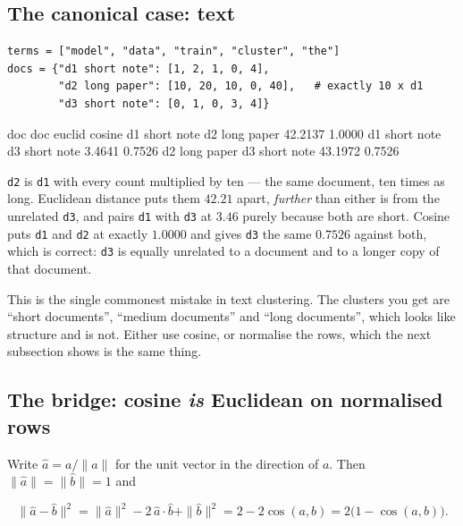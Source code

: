 \documentclass[11pt]{article}
\begin{document}
\subsection{The canonical case: text}

\begin{lstlisting}
terms = ["model", "data", "train", "cluster", "the"]
docs = {"d1 short note": [1, 2, 1, 0, 4],
        "d2 long paper": [10, 20, 10, 0, 40],   # exactly 10 x d1
        "d3 short note": [0, 1, 0, 3, 4]}
\end{lstlisting}
\begin{codeout}
doc            doc                euclid     cosine
d1 short note  d2 long paper     42.2137     1.0000
d1 short note  d3 short note      3.4641     0.7526
d2 long paper  d3 short note     43.1972     0.7526
\end{codeout}

\texttt{d2} is \texttt{d1} with every count multiplied by ten --- the same
document, ten times as long. Euclidean distance puts them $42.21$ apart,
\emph{further} than either is from the unrelated \texttt{d3}, and pairs
\texttt{d1} with \texttt{d3} at $3.46$ purely because both are short. Cosine
puts \texttt{d1} and \texttt{d2} at exactly $1.0000$ and gives \texttt{d3}
the same $0.7526$ against both, which is correct: \texttt{d3} is equally
unrelated to a document and to a longer copy of that document.

\begin{caution}
This is the single commonest mistake in text clustering. The clusters you get
are ``short documents'', ``medium documents'' and ``long documents'', which
looks like structure and is not. Either use cosine, or normalise the rows,
which the next subsection shows is the same thing.
\end{caution}

\subsection{The bridge: cosine \emph{is} Euclidean on normalised rows}

Write $\hat{a} = a/\|a\|$ for the unit vector in the direction of $a$. Then
$\|\hat a\| = \|\hat b\| = 1$ and

\begin{equation}
  \|\hat a - \hat b\|^2 = \|\hat a\|^2 - 2\,\hat a \cdot \hat b
  + \|\hat b\|^2 = 2 - 2\cos(a,b) = 2\big(1 - \cos(a,b)\big).
  \label{eq:bridge}
\end{equation}
\end{document}
